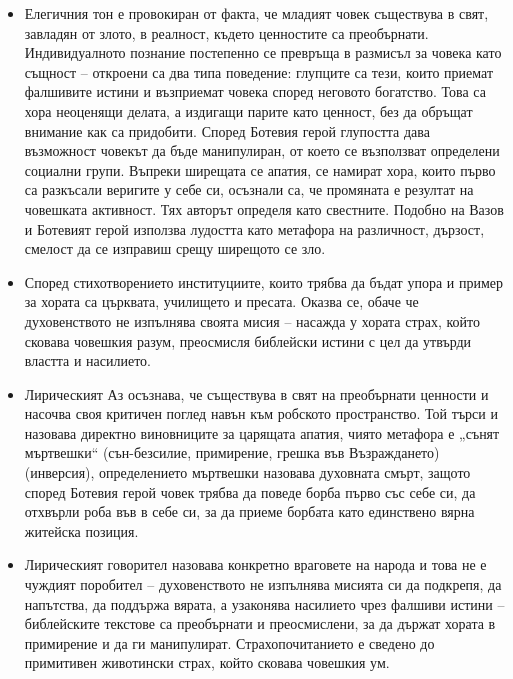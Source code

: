 \documentclass[12pt,a4paper]{article}
\begin{document}
\begin{itemize}[leftmargin=*]
\vspace{-0.20cm}
\item Елегичния тон е провокиран от факта, че младият човек съществува в свят, завладян от злото, в реалност, където ценностите са преобърнати. Индивидуалното познание постепенно се превръща в размисъл за човека като същност – откроени са два типа поведение: глупците са тези, които приемат фалшивите истини и възприемат човека според неговото богатство. Това са хора неоценящи делата, а издигащи парите като ценност, без да обръщат внимание как са придобити. Според Ботевия герой глупостта дава възможност човекът да бъде манипулиран, от което се възползват определени социални групи. Въпреки ширещата се апатия, се намират хора, които първо са разкъсали веригите у себе си, осъзнали са, че промяната е резултат на човешката активност. Тях авторът определя като свестните. Подобно на Вазов и Ботевият герой използва лудостта като метафора на различност, дързост, смелост да се изправиш срещу ширещото се зло.
\end{itemize}

\begin{itemize}[leftmargin=*]
\vspace{-0.45cm}
\item Според стихотворението институциите, които трябва да бъдат упора и пример за хората са църквата, училището и пресата. Оказва се, обаче че духовенството не изпълнява своята мисия – насажда у хората страх, който сковава човешкия разум, преосмисля библейски истини с цел да утвърди властта и насилието.
\end{itemize}

\begin{itemize}[leftmargin=*]
\vspace{-0.45cm}
\item Лирическият Аз осъзнава, че съществува в свят на преобърнати ценности и насочва своя критичен поглед навън към робското пространство. Той търси и назовава директно виновниците за царящата апатия, чиято метафора е „сънят мъртвешки“ (сън-безсилие, примирение, грешка във Възраждането) (инверсия), определението мъртвешки назовава духовната смърт, защото според Ботевия герой човек трябва да поведе борба първо със себе си, да отхвърли роба във в себе си, за да приеме борбата като единствено вярна житейска позиция.
\end{itemize}

\begin{itemize}[leftmargin=*]
\vspace{-0.45cm}
\item Лирическият говорител назовава конкретно враговете на народа и това не е чуждият поробител – духовенството не изпълнява мисията си да подкрепя, да напътства, да поддържа вярата, а узаконява насилието чрез фалшиви истини – библейските текстове са преобърнати и преосмислени, за да държат хората в примирение и да ги манипулират. Страхопочитанието е сведено до примитивен животински страх, който сковава човешкия ум.
\end{itemize}
\end{document}
